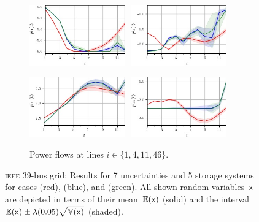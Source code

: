 \documentclass[final,3p,times,twocolumn]{elsarticle}  %
\begin{document}
\begin{figure}[h]
    \begin{subfigure}[c]{\figwidth}
    \centering
        \includegraphics[width=0.45\textwidth]{figures/time series/case39_volatile/line_901.jpg}~
    	\includegraphics[width=0.45\textwidth]{figures/time series/case39_volatile/line_904.jpg}%
    \end{subfigure}
    
    \begin{subfigure}[c]{\figwidth}
    \centering
    	\includegraphics[width=0.45\textwidth]{figures/time series/case39_volatile/line_911.jpg}~
    	\includegraphics[width=0.45\textwidth]{figures/time series/case39_volatile/line_946.jpg}%
    	\vspace{-2mm}	
    	\caption{Power flows at lines $i\in\{1,4,11,46\}$.}
    \end{subfigure}
    	
    \vspace{2mm}	
	\vspace{\adjustlength}
	\caption{\textsc{ieee} 39-bus grid: Results for 7 uncertainties and 5 storage systems for cases \caseNoStorage (red), \caseStorage (blue), and \caseStorageWithVariance (green). All shown random variables~$\mathsf{x}$ are depicted in terms of their mean~$\mathbb{E}(\mathsf{x})$ (solid) and the interval $\mathbb{E}(\mathsf{x}) \pm \lambda (0.05) \sqrt{\mathbb{V}(\mathsf{x})}$ (shaded).}
\end{figure}
\end{document}
